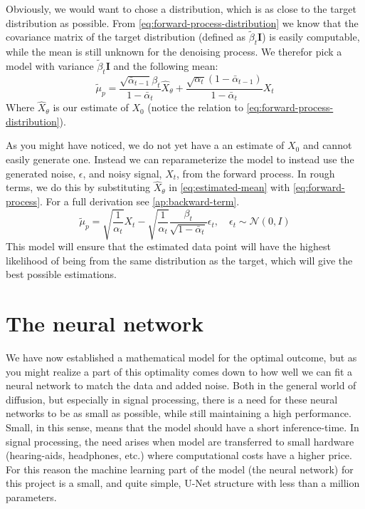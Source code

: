 \documentclass[a4paper, 12pt]{olplainarticle}
\begin{document}
Obviously, we would want to chose a distribution, which is as close to the target distribution as possible.
From \cref{eq:forward-process-distribution} we know that the covariance matrix of the target distribution (defined as $\tilde{\beta}_t \mathbf{I}$) is easily computable, while the mean is still unknown for the denoising process. 
We therefor pick a model with variance $\tilde{\beta}_t \mathbf{I}$ and the following mean:
\begin{equation} \label{eq:estimated-mean}
    \tilde{\mu}_p = \frac{\sqrt{\bar{\alpha}_{t-1}}\beta_t}{1-\bar{\alpha}_t}\hat{X}_{\theta} + \frac{\sqrt{\alpha_t}(1-\bar{\alpha}_{t-1})}{1-\bar{\alpha}_t}X_t
\end{equation}
Where $\hat{X}_{\theta}$ is our estimate of $X_0$ (notice the relation to \cref{eq:forward-process-distribution}).

As you might have noticed, we do not yet have a an estimate of $X_0$ and cannot easily generate one.
Instead we can reparameterize the model to instead use the generated noise, $\epsilon$, and noisy signal, $X_t$, from the forward process.
In rough terms, we do this by substituting $\hat{X}_{\theta}$ in \cref{eq:estimated-mean} with \cref{eq:forward-process}. For a full derivation see \cref{ap:backward-term}.
\begin{equation} \label{eq:denoising}
    \tilde{\mu}_p = \sqrt{\frac{1}{\alpha_t}}X_t - \sqrt{\frac{1}{\alpha_t}}\frac{\beta_t}{\sqrt{1-\bar{\alpha}_t}}\epsilon_t, \quad \epsilon_t \sim \mathcal{N}(0,I)
\end{equation}
This model will ensure that the estimated data point will have the highest likelihood of being from the same distribution as the target, which will give the best possible estimations.

\section*{The neural network}
We have now established a mathematical model for the optimal outcome, 
but as you might realize a part of this optimality comes down to how well we can fit a neural network to match the data and added noise.  
Both in the general world of diffusion, but especially in signal processing, there is a need for these neural networks to be as small as possible, while still maintaining a high performance.
Small, in this sense, means that the model should have a short inference-time.
In signal processing, the need arises when model are transferred to small hardware (hearing-aids, headphones, etc.) where computational costs have a higher price.
For this reason the machine learning part of the model (the neural network) for this project is a small, and quite simple, U-Net structure with less than a million parameters.
\end{document}
